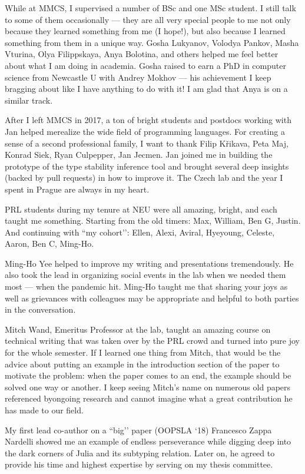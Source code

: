 While at MMCS, I supervised a number of BSc and one MSc student. I still talk to some of them occasionally — they are all very special people to me not only because they learned something from me (I hope!), but also because I learned something from them in a unique way. Gosha Lukyanov, Volodya Pankov, Masha Vturina, Olya Filippskaya, Anya Bolotina, and others helped me feel better about what I am doing in academia. Gosha raised to earn a PhD in computer science from Newcastle U with Andrey Mokhov — his achievement I keep bragging about like I have anything to do with it! I am glad that Anya is on a similar track.

After I left MMCS in 2017, a ton of bright students and postdocs working with Jan helped merealize the wide field of programming languages. For creating a sense of a second professional family, I want to thank Filip Křikava, Peta Maj, Konrad Siek, Ryan Culpepper, Jan Jecmen. Jan joined me in building the prototype of the type stability inference tool and brought several deep insights (backed by pull requests) in how to improve it. The Czech lab and the year I spent in Prague are always in my heart.

PRL students during my tenure at NEU were all amazing, bright, and each taught me something. Starting from the old timers: Max, William, Ben G, Justin. And continuing with ``my cohort’’: Ellen, Alexi, Aviral, Hyeyoung, Celeste, Aaron, Ben C, Ming-Ho.

Ming-Ho Yee helped to improve my writing and presentations tremendously. He also took the lead in organizing social events in the lab when we needed them most — when the pandemic hit. Ming-Ho taught me that sharing your joys as well as grievances with colleagues may be appropriate and helpful to both parties in the conversation.

Mitch Wand, Emeritus Professor at the lab, taught an amazing course on technical writing that was taken over by the PRL crowd and turned into pure joy for the whole semester. If I learned one thing from Mitch, that would be the advice about putting an example in the introduction section of the paper to motivate the problem: when the paper comes to an end, the example should be solved one way or another. I keep seeing Mitch’s name on numerous old papers referenced byongoing research and cannot imagine what a great contribution he has made to our field.

My first lead co-author on a ``big’’ paper (OOPSLA ‘18) Francesco Zappa Nardelli showed me an example of endless perseverance while digging deep into the dark corners of Julia and its subtyping relation. Later on, he agreed to provide his time and highest expertise by serving on my thesis committee.

